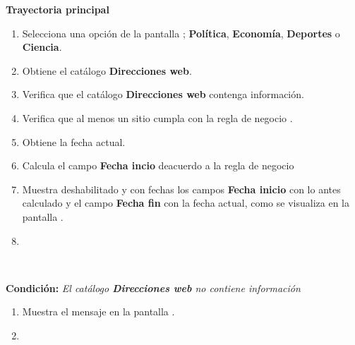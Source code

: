

\begin{large}
	\textbf{Trayectoria principal}\\
\end{large}	

\begin{enumerate}[1.]
	
	\item \actor Selecciona una opción de la pantalla ; \textbf{Política}, \textbf{Economía}, \textbf{Deportes} o \textbf{Ciencia}. 
	
	\item \sistema Obtiene el catálogo \textbf{Direcciones web}.
	
	\item \sistema Verifica que el catálogo \textbf{Direcciones web} contenga información. 
	
	\item \sistema Verifica que al menos un sitio cumpla con la regla de negocio . 

	\item \sistema Obtiene la fecha actual.

	\item \sistema \label{CU1:FechaI}Calcula el campo \textbf{Fecha incio} deacuerdo a la regla de negocio 

	\item \label{CU1:Pantalla}\sistema Muestra deshabilitado y con fechas los campos \textbf{Fecha inicio} con lo antes calculado y el campo \textbf{Fecha fin} con la fecha actual, como se visualiza en la pantalla .
	
	\item \finCU	

\end{enumerate}



\begin{large}
	\\
\end{large}	
\textbf{Condición:} \textit{El catálogo \textbf{Direcciones web} no contiene información}

\begin{enumerate}[{A-}1.]

	\item \sistema Muestra el mensaje  en la pantalla .
	\item \finCU	

\end{enumerate}

